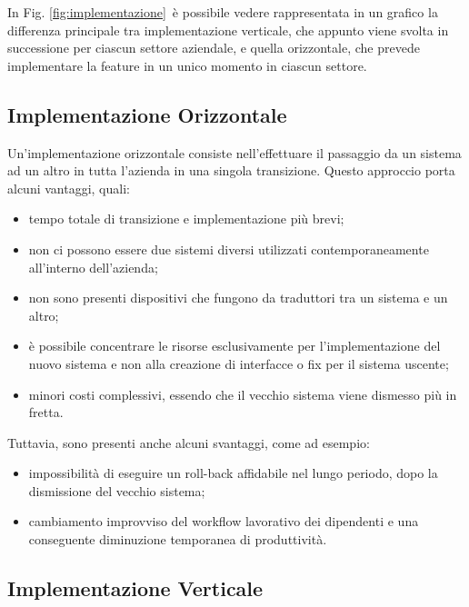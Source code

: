 	In Fig. \ref{fig:implementazione}~è possibile vedere rappresentata in un grafico la differenza principale tra implementazione verticale, che appunto viene svolta in successione per ciascun settore aziendale, e quella orizzontale, che prevede implementare la feature in un unico momento in ciascun settore.

\newpage
\subsection{Implementazione Orizzontale}

	Un'implementazione orizzontale consiste nell'effettuare il passaggio da un sistema ad un altro in tutta l'azienda in una singola transizione.
	Questo approccio porta alcuni vantaggi, quali:
	\begin{itemize}[noitemsep]
		\renewcommand\labelitemi{--}
		\item tempo totale di transizione e implementazione più brevi;
		\item non ci possono essere due sistemi diversi utilizzati contemporaneamente all’interno dell’azienda;
		\item non sono presenti dispositivi che fungono da traduttori tra un sistema e un altro;
		\item è possibile concentrare le risorse esclusivamente per l'implementazione del nuovo sistema e non alla creazione di interfacce o fix per il sistema uscente;
		\item minori costi complessivi, essendo che il vecchio sistema viene dismesso più in fretta.
	\end{itemize}
	
	Tuttavia, sono presenti anche alcuni svantaggi, come ad esempio:
	\begin{itemize}[noitemsep]
		\renewcommand\labelitemi{--}
		\item impossibilità di eseguire un roll-back affidabile nel lungo periodo, dopo la dismissione del vecchio sistema;
		\item cambiamento improvviso del workflow lavorativo dei dipendenti e una conseguente diminuzione temporanea di produttività.
	\end{itemize}

\subsection{Implementazione Verticale}

